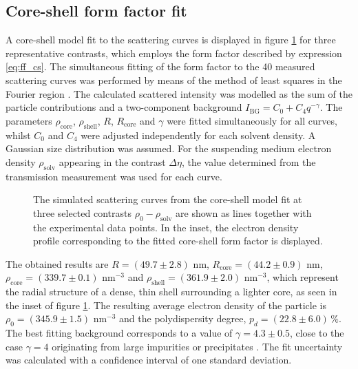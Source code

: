 \subsection{Core-shell form factor fit}
\label{sec:coreshell_fit}
A core-shell model fit to the scattering curves is displayed in figure \ref{fig:KiskerSAXSCoreshellFit} for three representative contrasts, which employs the form factor described by expression \ref{eq:ff_cs}. The simultaneous fitting of the form factor to the 40 measured scattering curves was performed by means of the method of least squares in the Fourier region \citep{pedersen_analysis_1997}. The calculated scattered intensity was modelled as the sum of the particle contributions and a two-component background \(I_{\text{BG}}=C_0+C_4q^{-\gamma} \). The parameters \(\rho_{\text{core}}\), \(\rho_{\text{shell}}\), \(R\), \(R_{\text{core}}\) and \(\gamma\) were fitted simultaneously for all curves, whilst \( C_0 \) and \( C_4 \) were adjusted independently for each solvent density. A Gaussian size distribution was assumed. For the suspending medium electron density \( \rho_{\text{solv}} \) appearing in the contrast \( \Delta\eta \), the value determined from the transmission measurement was used for each curve.

\begin{figure}%
	\centering
		
		\caption[Core-shell model fit to the PS-COOH particles experimental data.]{The simulated scattering curves from the core-shell model fit at three selected contrasts $\rho_0-\rho_{\text{solv}}$ are shown as lines together with the experimental data points. In the inset, the electron density profile corresponding to the fitted core-shell form factor is displayed.}
		\label{fig:KiskerSAXSCoreshellFit}
\end{figure}

The obtained results are \(R=\left(49.7 \pm 2.8\right) \) nm, \(R_{\text{core}}=\left(44.2 \pm 0.9\right) \) nm, \(\rho_{\text{core}}=\left(339.7 \pm 0.1\right)\) nm\(^{-3}\) and \(\rho_{\text{shell}}=\left(361.9 \pm 2.0\right)\) nm\(^{-3}\), which represent the radial structure of a dense, thin shell surrounding a lighter core, as seen in the inset of figure \ref{fig:KiskerSAXSCoreshellFit}. The resulting average electron density of the particle is \(\rho_{0}=\left(345.9 \pm 1.5\right)\) nm\(^{-3}\) and the polydispersity degree, \(p_d=\left(22.8\pm 6.0\right)\,\%\). The best fitting background corresponds to a value of \( \gamma = 4.3\pm 0.5 \), close to the case \( \gamma = 4 \) originating from large impurities or precipitates \citep{pedersen_determination_1994}. The fit uncertainty was calculated with a confidence interval of one standard deviation.

